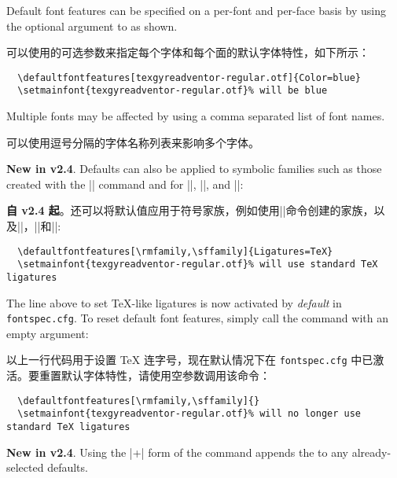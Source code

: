 \documentclass[a4paper]{l3doc}
\begin{document}

Default font features can be specified on a per-font and per-face basis
by using the optional argument to  as shown.

可以使用的可选参数来指定每个字体和每个面的默认字体特性，如下所示：

\begin{Verbatim}
  \defaultfontfeatures[texgyreadventor-regular.otf]{Color=blue}
  \setmainfont{texgyreadventor-regular.otf}% will be blue
\end{Verbatim}
Multiple fonts may be affected by using a comma separated list of font names.

可以使用逗号分隔的字体名称列表来影响多个字体。



\textbf{New in v2.4}.
Defaults can also be applied to symbolic families such as those created with the |\newfontfamily| command and for |\rmfamily|, |\sffamily|, and |\ttfamily|:

\textbf{自 v2.4 起}。还可以将默认值应用于符号家族，例如使用|\newfontfamily|命令创建的家族，以及|\rmfamily|，|\sffamily|和|\ttfamily|:

\begin{Verbatim}
  \defaultfontfeatures[\rmfamily,\sffamily]{Ligatures=TeX}
  \setmainfont{texgyreadventor-regular.otf}% will use standard TeX ligatures
\end{Verbatim}
The line above to set \TeX-like ligatures is now activated by \emph{default} in \texttt{fontspec.cfg}.
To reset default font features, simply call the command with an empty argument:

以上一行代码用于设置 \TeX{} 连字号，现在默认情况下在 \texttt{fontspec.cfg} 中已激活。要重置默认字体特性，请使用空参数调用该命令：
\begin{Verbatim}
  \defaultfontfeatures[\rmfamily,\sffamily]{}
  \setmainfont{texgyreadventor-regular.otf}% will no longer use standard TeX ligatures
\end{Verbatim}


\textbf{New in v2.4}.
Using the |+| form of the command appends the  to any already-selected defaults.
\end{document}
